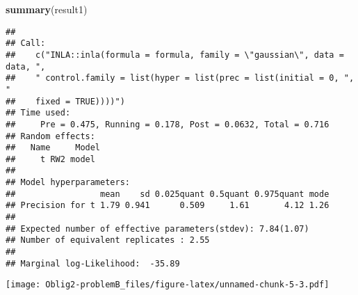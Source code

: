 \documentclass[
]{article}
\newenvironment{Shaded}{\begin{snugshade}}{\end{snugshade}}
\newcommand{\DataTypeTok}[1]{\textcolor[rgb]{0.13,0.29,0.53}{#1}}
\newcommand{\DecValTok}[1]{\textcolor[rgb]{0.00,0.00,0.81}{#1}}
\newcommand{\FloatTok}[1]{\textcolor[rgb]{0.00,0.00,0.81}{#1}}
\newcommand{\KeywordTok}[1]{\textcolor[rgb]{0.13,0.29,0.53}{\textbf{#1}}}
\newcommand{\NormalTok}[1]{#1}
\newcommand{\OperatorTok}[1]{\textcolor[rgb]{0.81,0.36,0.00}{\textbf{#1}}}
\begin{document}
\begin{Shaded}
\begin{Highlighting}[]
\KeywordTok{summary}\NormalTok{(result1)}
\end{Highlighting}
\end{Shaded}

\begin{verbatim}
## 
## Call:
##    c("INLA::inla(formula = formula, family = \"gaussian\", data = data, ", 
##    " control.family = list(hyper = list(prec = list(initial = 0, ", " 
##    fixed = TRUE))))") 
## Time used:
##     Pre = 0.475, Running = 0.178, Post = 0.0632, Total = 0.716 
## Random effects:
##   Name     Model
##     t RW2 model
## 
## Model hyperparameters:
##                 mean    sd 0.025quant 0.5quant 0.975quant mode
## Precision for t 1.79 0.941      0.509     1.61       4.12 1.26
## 
## Expected number of effective parameters(stdev): 7.84(1.07)
## Number of equivalent replicates : 2.55 
## 
## Marginal log-Likelihood:  -35.89
\end{verbatim}

\begin{Shaded}
\end{Shaded}

\texttt{[image: Oblig2-problemB\_files/figure-latex/unnamed-chunk-5-3.pdf]}
\end{document}
